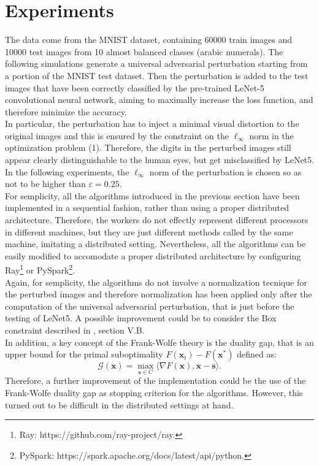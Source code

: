 \section{Experiments}
The data come from the MNIST dataset, containing 60000 train images and 10000 test images from 10 almost balanced classes (arabic numerals). The following simulations generate a universal adversarial perturbation starting from a portion of the MNIST test dataset. Then the perturbation is added to the test images that have been correctly classified by the pre-trained LeNet-5 convolutional neural network, aiming to maximally increase the loss function, and therefore minimize the accuracy.\\
In particular, the perturbation has to inject a minimal visual distortion to the original images and this is ensured by the constraint on the $\ell_{\infty}$ norm in the optimization problem (1). Therefore, the digits in the perturbed images still appear clearly distinguishable to the human eyes, but get misclassified by LeNet5.\\
In the following experiments, the $\ell_{\infty}$ norm of the perturbation is chosen so as not to be higher than $\varepsilon=0.25$.\\

For semplicity, all the algorithms introduced in the previous section have been implemented in a sequential fashion, rather than using a proper distributed architecture. Therefore, the workers do not effectly represent different processors in different machines, but they are just different methods called by the same machine, imitating a distributed setting. Nevertheless, all the algorithms can be easily modified to accomodate a proper distributed architecture by configuring Ray\footnote{Ray: https://github.com/ray-project/ray.} or PySpark\footnote{PySpark: https://spark.apache.org/docs/latest/api/python.}.\\

Again, for semplicity, the algorithms do not involve a normalization tecnique for the perturbed images and therefore normalization has been applied only after the computation of the universal adversarial perturbation, that is just before the testing of LeNet5. A possible improvement could be to consider the Box constraint described in \cite{A1}, section V.B.\\

In addition, a key concept of the Frank-Wolfe theory is the duality gap, that is an upper bound for the primal suboptimality $F(\mathbf{x}_t)-F(\mathbf{x}^*)$ defined as:
\begin{equation}
	\mathcal{G}(\mathbf{x}) =\max_{\mathbf{s}\in\mathit{C}} \langle \nabla F(\mathbf{x}),\mathbf{x}-\mathbf{s}\rangle.
\end{equation}
Therefore, a further improvement of the implementation could be the use of the Frank-Wolfe duality gap as stopping criterion for the algorithms. However, this turned out to be difficult in the distributed settings at hand.

